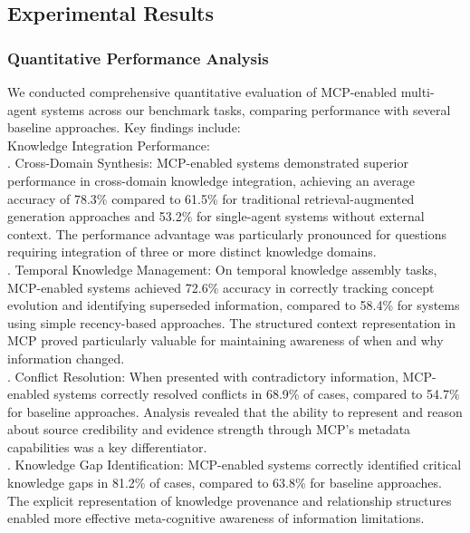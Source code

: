 \subsection{Experimental Results}
\subsubsection{Quantitative Performance Analysis}
We conducted comprehensive quantitative evaluation of MCP-enabled multi-agent systems across our benchmark tasks, comparing performance with several baseline approaches. Key findings include:\\ \newline
Knowledge Integration Performance:\\ . Cross-Domain Synthesis: MCP-enabled systems demonstrated superior performance in cross-domain knowledge integration, achieving an average accuracy of 78.3\% compared to 61.5\% for traditional retrieval-augmented generation approaches and 53.2\% for single-agent systems without external context. The performance advantage was particularly pronounced for questions requiring integration of three or more distinct knowledge domains.\\ . Temporal Knowledge Management: On temporal knowledge assembly tasks, MCP-enabled systems achieved 72.6\% accuracy in correctly tracking concept evolution and identifying superseded information, compared to 58.4\% for systems using simple recency-based approaches. The structured context representation in MCP proved particularly valuable for maintaining awareness of when and why information changed.\\ . Conflict Resolution: When presented with contradictory information, MCP-enabled systems correctly resolved conflicts in 68.9\% of cases, compared to 54.7\% for baseline approaches. Analysis revealed that the ability to represent and reason about source credibility and evidence strength through MCP's metadata capabilities was a key differentiator.\\ . Knowledge Gap Identification: MCP-enabled systems correctly identified critical knowledge gaps in 81.2\% of cases, compared to 63.8\% for baseline approaches. The explicit representation of knowledge provenance and relationship structures enabled more effective meta-cognitive awareness of information limitations.\\ \newline
